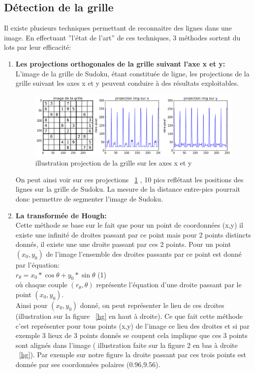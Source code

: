 \documentclass[11pt]{article}
\begin{document}
	\subsection{Détection de la grille}
Il existe plusieurs techniques permettant de reconnaitre des lignes dans une image. En effectuant ''l'état de l'art'' de ces techniques, 3 méthodes sortent du lots par leur efficacité:
\begin{enumerate}
	\item \textbf{Les projections orthogonales de la grille suivant l'axe x et y:}\\
	L'image de la grille de Sudoku, étant constituée de ligne, les projections de la grille suivant les axes x et y peuvent conduire à des résultats exploitables.\\
	\begin{figure}[!h]
	\centering
   		\includegraphics[scale = 0.5]{pp.png}
   		\caption{\label{pp} illustration projection de la grille sur les axes x et y}
	\end{figure}
	On peut ainsi voir sur ces projections ~\ref{pp} , 10 pics reflétant les positions des lignes sur la grille de Sudoku. La mesure de la distance entre-pics pourrait donc permettre de segmenter l'image de Sudoku. 
	\item \textbf{La transformée de Hough:}\\
	Cette méthode se base sur le fait que pour un point de coordonnées (x,y) il existe une infinité de droites passant par ce point mais pour 2 points distincts donnés, il existe une une droite passant par ces 2 points. Pour un point $(x_0,y_0)$ de l'image l'ensemble des droites passants par ce point est donné par l'équation:\\
	$r_\theta = x_0*\cos \theta + y_0*\sin \theta$ (1) \\
	où chaque couple $(r_\theta,\theta)$ représente l'équation d'une droite passant par le point $(x_0,y_0)$.\\
	Ainsi pour $(x_0,y_0)$ donné, on peut représenter le lieu de ces droites (illustration sur la figure ~\ref{hg} en haut à droite). Ce que fait cette méthode c'est représenter pour tous points (x,y) de l'image ce lieu des droites et si par exemple 3 lieux de 3 points donnés se coupent cela implique que ces 3 points sont alignés dans l'image ( illustration faite sur la figure 2 en bas à droite ~\ref{hg}). Par exemple sur notre figure la droite passant par ces trois points est donnée par ses coordonnées polaires (0.96,9.56).\\

\end{enumerate}
\end{document}
